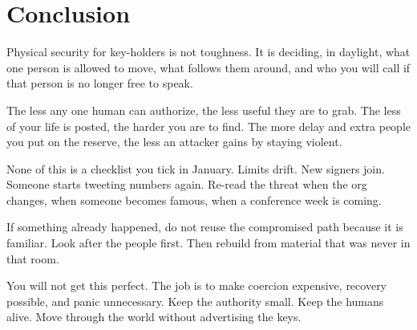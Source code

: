 \chapter{Conclusion}

Physical security for key-holders is not toughness. It
is deciding, in daylight, what one person is allowed to
move, what follows them around, and who you will call if
that person is no longer free to speak.

The less any one human can authorize, the less useful
they are to grab. The less of your life is posted, the
harder you are to find. The more delay and extra people
you put on the reserve, the less an attacker gains by
staying violent.

None of this is a checklist you tick in January. Limits
drift. New signers join. Someone starts tweeting numbers
again. Re-read the threat when the org changes, when
someone becomes famous, when a conference week is coming.

If something already happened, do not reuse the
compromised path because it is familiar. Look after the
people first. Then rebuild from material that was never
in that room.

You will not get this perfect. The job is to make
coercion expensive, recovery possible, and panic
unnecessary. Keep the authority small. Keep the humans
alive. Move through the world without advertising the
keys.
